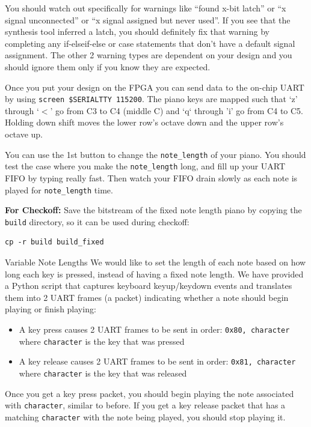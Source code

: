 \documentclass[11pt]{article}
\makeatletter
\renewcommand{\section}
{\@startsection {section}{1}{0pt}
 {-2ex}
 {1ex}
 {\bfseries\Large}}
\makeatother
\begin{document}
You should watch out specifically for warnings like ``found x-bit latch'' or ``x signal unconnected'' or ``x signal assigned but never used''.
If you see that the synthesis tool inferred a latch, you should definitely fix that warning by completing any if-elseif-else or case statements that don't have a default signal assignment.
The other 2 warning types are dependent on your design and you should ignore them only if you know they are expected.

Once you put your design on the FPGA you can send data to the on-chip UART by using \verb|screen $SERIALTTY 115200|.
The piano keys are mapped such that `z' through `$<$' go from C3 to C4 (middle C) and `q` through 'i' go from C4 to C5.
Holding down shift moves the lower row's octave down and the upper row's octave up.

You can use the 1st button to change the \verb|note_length| of your piano.
You should test the case where you make the \verb|note_length| long, and fill up your UART FIFO by typing really fast.
Then watch your FIFO drain slowly as each note is played for \verb|note_length| time.

\textbf{For Checkoff:} Save the bitstream of the fixed note length piano by copying the \verb|build| directory, so it can be used during checkoff:
\begin{verbatim}
cp -r build build_fixed
\end{verbatim}

\section{Variable Note Lengths}
We would like to set the length of each note based on how long each key is pressed, instead of having a fixed note length.
We have provided a Python script that captures keyboard keyup/keydown events and translates them into 2 UART frames (a packet) indicating whether a note should begin playing or finish playing:

\begin{itemize}
  \item A key press causes 2 UART frames to be sent in order: \texttt{0x80, character} where \texttt{character} is the key that was pressed
  \item A key release causes 2 UART frames to be sent in order: \texttt{0x81, character} where \texttt{character} is the key that was released
\end{itemize}

Once you get a key press packet, you should begin playing the note associated with \texttt{character}, similar to before.
If you get a key release packet that has a matching \texttt{character} with the note being played, you should stop playing it.
\end{document}
